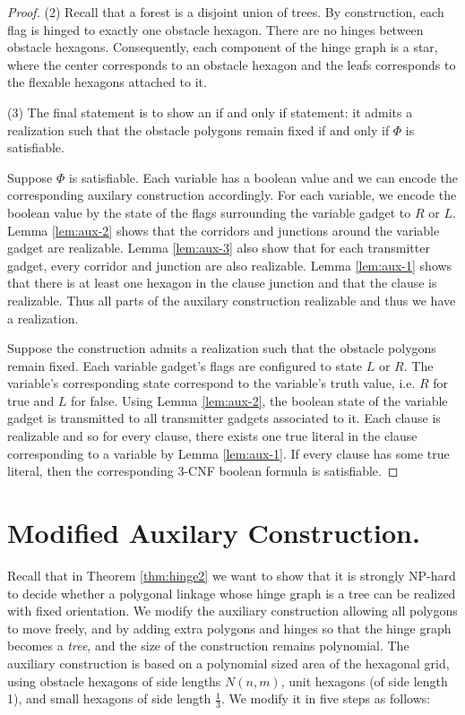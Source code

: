 \documentclass[10pt]{CSUNthesis}
\theoremstyle{plain}%
\theoremstyle{definition}
\theoremstyle{remark}
\begin{document}
\begin{proof}
\noindent (2) Recall that a forest is a disjoint union of trees. 
By construction, each flag is hinged to exactly one obstacle hexagon.  
There are no hinges between obstacle hexagons.
Consequently, each component of the hinge graph is a star, where the center corresponds to an obstacle hexagon and the leafs corresponds to the flexable hexagons attached to it.

\noindent (3) The final statement is to show an if and only if statement: it admits a realization such that the obstacle polygons remain fixed if and only if $\Phi$ is satisfiable.

Suppose $\Phi$ is satisfiable.  %
Each variable has a boolean value and we can encode the corresponding auxilary construction accordingly.  
For each variable, we encode the boolean value by the state of the flags surrounding the variable gadget to $R$ or $L$.  
Lemma \ref{lem:aux-2} shows that the corridors and junctions around the variable gadget are realizable.
Lemma \ref{lem:aux-3} also show that for each transmitter gadget, every corridor and junction are also realizable. 
Lemma \ref{lem:aux-1} shows that there is at least one hexagon in the clause junction and that the clause is realizable.
Thus all parts of the auxilary construction realizable and thus we have a realization.

Suppose the construction admits a realization such that the obstacle polygons remain fixed.
Each variable gadget's flags are configured to state $L$ or $R$. 
The variable's corresponding state correspond to the variable's truth value, i.e. $R$ for true and $L$ for false.
Using Lemma \ref{lem:aux-2}, the boolean state of the variable gadget is transmitted to all transmitter gadgets associated to it.
Each clause is realizable and so for every clause, there exists one true literal in the clause corresponding to a variable by Lemma \ref{lem:aux-1}. 
If every clause has some true literal, then the corresponding 3-CNF boolean formula is satisfiable.
\end{proof}
\section{Modified Auxilary Construction.}

Recall that in Theorem \ref{thm:hinge2} we want to show that it is strongly NP-hard to decide whether a polygonal linkage whose hinge graph is a tree can be realized with fixed orientation.
We modify the auxiliary construction allowing all polygons to move freely, and by adding extra polygons and hinges so that the hinge graph becomes a \emph{tree}, and the size of the construction remains polynomial. 
The auxiliary construction is based on a polynomial sized area of the hexagonal grid, using obstacle hexagons of side lengths $N(n,m)$, unit hexagons (of side length 1), and small hexagons of side length $\frac{1}{3}$. 
We modify it in five steps as follows:
\end{document}
